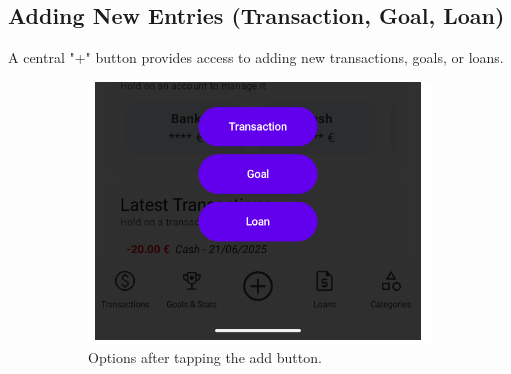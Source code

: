 \documentclass[a4paper,12pt]{article}
\begin{document}
\subsection{Adding New Entries (Transaction, Goal, Loan)}
A central "+" button provides access to adding new transactions, goals, or loans.

\begin{figure}[H]
    \centering
    \begin{subfigure}[b]{0.23\textwidth}
        \includegraphics[width=\textwidth]{add_dialog.png}
        \caption{Options after tapping the add button.}
        \label{fig:add_options}
    \end{subfigure}
    \hfill
    \begin{subfigure}[b]{0.23\textwidth}

\end{subfigure}
\end{figure}
\end{document}
